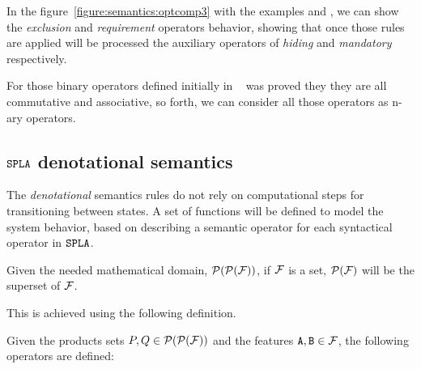 In the figure~\ref{figure:semantics:optcomp3} with the examples
 and , we can show the \emph{exclusion} and \emph{requirement}
operators behavior, showing that once those rules are applied will be
processed the auxiliary operators of \emph{hiding} and \emph{mandatory}
respectively.

For those binary operators defined initially in ~\cite{acl13}
was proved they they are all
commutative and associative,
so forth, we can consider all those operators as
n-ary operators.


\subsection{$\mathtt{SPLA}$ denotational semantics}
\label{sec:foda:denotational}

The \emph{denotational}
semantics rules do not rely
on computational steps for transitioning between
states. A set of functions will be defined
to model the system behavior, based on describing a
semantic operator for each syntactical operator in $\mathtt{SPLA}$.


Given the needed mathematical domain, ${\cal P}({\cal P}({\cal F}))$,
if ${\cal F}$ is a set,
${\cal P}({\cal F})$ will be the superset of ${\cal F}$.

This is achieved using the following definition.

\bdfn\label{def:semmatic:operators}
Given the products sets $P, Q\in{\cal P}({\cal P}({\cal F}))$
and the features $\mathtt{A},\mathtt{B}\in{\cal F}$,
the following operators are defined:

